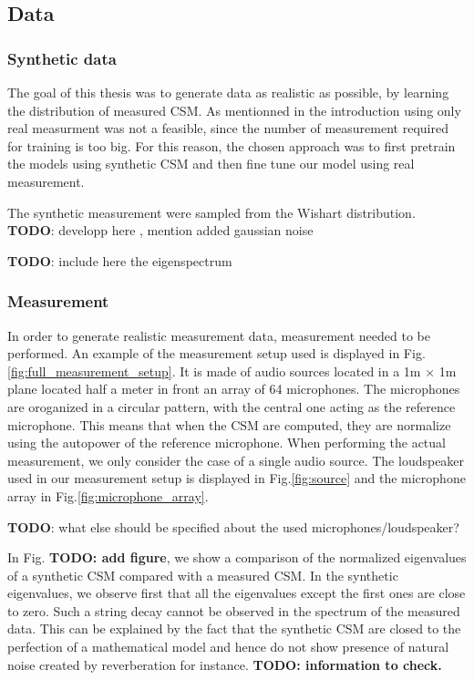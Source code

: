 \documentclass{article}
\begin{document}
\subsection{Data}

\subsubsection{Synthetic data}

The goal of this thesis was to generate data as realistic as possible, by learning the distribution of measured CSM. As mentionned in the introduction using only real measurment was not a feasible, since the number of measurement required for training is too big. For this reason, the chosen approach was to first pretrain the models using synthetic CSM and then fine tune our model using real measurement.

The synthetic measurement were sampled from the Wishart distribution. \textbf{TODO}: developp here , mention added gaussian noise

\textbf{TODO}: include here the eigenspectrum 

\subsubsection{Measurement}

In order to generate realistic measurement data, measurement needed to be performed. An example of the measurement setup used is displayed in Fig.\ref{fig:full_measurement_setup}. It is made of audio sources located in a 1m $\times$ 1m plane located half a meter in front an array of 64 microphones. The microphones are oroganized in a circular pattern, with the central one acting as the reference microphone. This means that when the CSM are computed, they are normalize using the autopower of the reference microphone. When performing the actual measurement, we only consider the case of a single audio source. The loudspeaker used in our measurement setup is displayed in Fig.\ref{fig:source} and the microphone array in Fig.\ref{fig:microphone_array}.

\textbf{TODO}: what else should be specified about the used microphones/loudspeaker?


In Fig. \textbf{TODO: add figure}, we show a comparison of the normalized eigenvalues of a synthetic CSM compared with a measured CSM. In the synthetic eigenvalues, we observe first that all the eigenvalues except the first ones are close to zero. Such a string decay cannot be observed in the spectrum of the measured data. This can be explained by the fact that the synthetic CSM are closed to the perfection of a mathematical model and hence do not show presence of natural noise created by reverberation for instance. \textbf{TODO: information to check.}  
\end{document}

